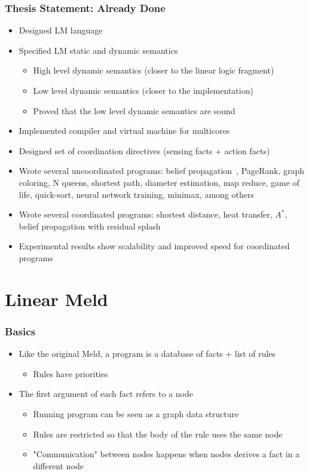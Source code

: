 \documentclass{beamer}
\begin{document}
\begin{frame}[fragile]
   \frametitle{Thesis Statement: Already Done}
   \begin{itemize}
      \item Designed LM language
      \item Specified LM static and dynamic semantics
      \begin{itemize}
         \item High level dynamic semantics (closer to the linear logic fragment)
         \item Low level dynamic semantics (closer to the implementation)
         \item Proved that the low level dynamic semantics are sound
      \end{itemize}
      \item Implemented compiler and virtual machine for multicores
      \item Designed set of coordination directives (sensing facts + action facts)
      \item Wrote several uncoordinated programs: belief propagation~\cite{Gonzalez+al:aistats09paraml},
      PageRank, graph coloring,
      N queens, shortest path, diameter estimation, map reduce, game of life, quick-sort, neural network training, minimax, among others
      \item Wrote several coordinated programs: shortest distance, heat transfer, $A^{*}$, belief propagation with residual splash~\cite{Gonzalez+al:aistats09paraml}
      \item Experimental results show scalability and improved speed for coordinated programs
   \end{itemize}
\end{frame}

\section{Linear Meld}

\begin{frame}[fragile]
   \frametitle{Basics}
   \begin{itemize}
      \item Like the original Meld, a program is a database of facts + list of rules
      \begin{itemize}
         \item Rules have priorities
      \end{itemize}
      \item The first argument of each fact refers to a node
      \begin{itemize}
         \item Running program can be seen as a graph data structure
         \item Rules are restricted so that the body of the rule uses the same node
         \item "Communication" between nodes happens when nodes derives a fact in a different node
      \end{itemize}
   \end{itemize}
\end{frame}
\end{document}
